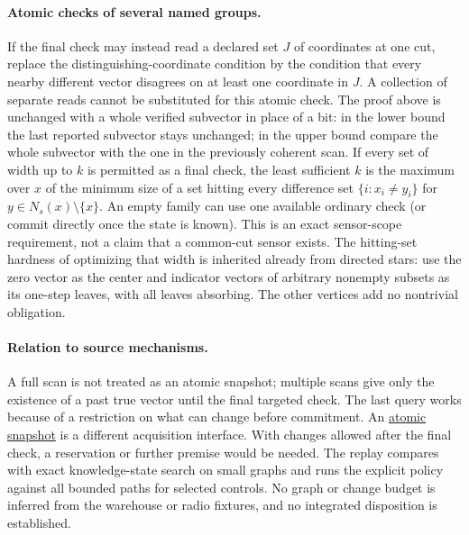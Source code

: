 \documentclass[11pt]{article}
\begin{document}
\paragraph{Atomic checks of several named groups.}
If the final check may instead read a declared set $J$ of coordinates at one cut, replace the distinguishing-coordinate condition by the condition that every nearby different vector disagrees on at least one coordinate in $J$. A collection of separate reads cannot be substituted for this atomic check. The proof above is unchanged with a whole verified subvector in place of a bit: in the lower bound the last reported subvector stays unchanged; in the upper bound compare the whole subvector with the one in the previously coherent scan. If every set of width up to $k$ is permitted as a final check, the least sufficient $k$ is the maximum over $x$ of the minimum size of a set hitting every difference set $\{i:x_i\ne y_i\}$ for $y\in N_s(x)\setminus\{x\}$. An empty family can use one available ordinary check (or commit directly once the state is known). This is an exact sensor-scope requirement, not a claim that a common-cut sensor exists. The hitting-set hardness of optimizing that width is inherited already from directed stars: use the zero vector as the center and indicator vectors of arbitrary nonempty subsets as its one-step leaves, with all leaves absorbing. The other vertices add no nontrivial obligation.

\paragraph{Relation to source mechanisms.}
A full scan is not treated as an atomic snapshot; multiple scans give only the existence of a past true vector until the final targeted check. The last query works because of a restriction on what can change before commitment. An \href{https://dspace.mit.edu/entities/publication/355717a8-388a-46a4-afc6-800d0d1522b8}{atomic snapshot} is a different acquisition interface. With changes allowed after the final check, a reservation or further premise would be needed. The replay compares with exact knowledge-state search on small graphs and runs the explicit policy against all bounded paths for selected controls. No graph or change budget is inferred from the warehouse or radio fixtures, and no integrated disposition is established.
\end{document}
